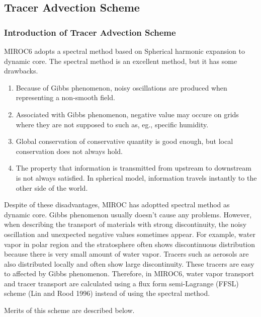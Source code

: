 \hypertarget{tracer-advection-scheme}{%
\subsection{Tracer Advection Scheme}\label{tracer-advection-scheme}}

\hypertarget{introduction-of-tracer-advection-scheme}{%
\subsubsection{Introduction of Tracer Advection Scheme}\label{introduction-of-tracer-advection-scheme}}

MIROC6 adopts a spectral method based on Spherical harmonic expansion to dynamic core. The spectral method is an excellent method, but it has some drawbacks.

\begin{enumerate}
\def\labelenumi{\arabic{enumi}.}
\item
  Because of Gibbs phenomenon, noisy oscillations are produced when representing a non-smooth field.
\item
  Associated with Gibbs phenomenon, negative value may occure on grids where they are not supposed to such as, eg., specific humidity.
\item
  Global conservation of conservative quantity is good enough, but local conservation does not always hold.
\item
  The property that information is transmitted from upstream to downstream is not always satisfied. In spherical model, information travels instantly to the other side of the world.
\end{enumerate}

Despite of these disadvantages, MIROC has adoptted spectral method as dynamic core. Gibbs phenomenon usually doesn't cause any problems. However, when describing the transport of materials with strong
discontinuity, the noisy oscillation and unexpected negative values sometimes appear. For example, water vapor in polar region and the stratosphere often shows discontinuous distribution because there
is very small amount of water vapor. Tracers such as aerosols are also distributed locally and often show large discontinuity. These tracers are easy to affected by Gibbs phenomenon. Therefore, in
MIROC6, water vapor transport and tracer transport are calculated using a flux form semi-Lagrange (FFSL) scheme (Lin and Rood 1996) instead of using the spectral method.

Merits of this scheme are described below.

